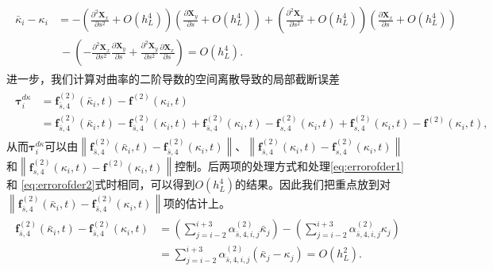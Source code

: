 \documentclass[a4paper,twoside]{ctexart}
\newcommand{\pdfrac}[2]{\frac{\partial #1}{\partial #2}}
\begin{document}
\begin{eqnarray}
  \begin{aligned}
  \label{eq:errorofcurv}
  \bar{\kappa}_i - \kappa_i &= -(\frac{\partial^2\boldsymbol X_x}{\partial
    s^2}+O(h_L^4))(\pdfrac{\boldsymbol X_y}{s}+O(h_L^4)) + (\frac{\partial^2\boldsymbol X_y}{\partial
                              s^2}+O(h_L^4))(\pdfrac{\boldsymbol X_x}{s}+O(h_L^4)) \\
  &\ -( -\frac{\partial^2\boldsymbol X_x}{\partial
    s^2}\pdfrac{\boldsymbol X_y}{s} + \frac{\partial^2\boldsymbol X_y}{\partial
    s^2}\pdfrac{\boldsymbol X_x}{s} )= O(h_L^4).
    \end{aligned}
\end{eqnarray}
\indent 进一步，我们计算对曲率的二阶导数的空间离散导致的局部截断误差
\begin{eqnarray}
  \begin{aligned}
  \boldsymbol{\tau}_i^{d\kappa} &=
  \boldsymbol f_{\bar{s},4}^{(2)}(\bar{\kappa}_i,t) -
  \boldsymbol f^{(2)}(\kappa_i,t)\\
  &= \boldsymbol f_{\bar{s},4}^{(2)}(\bar{\kappa}_i,t) -
  \boldsymbol f_{\bar{s},4}^{(2)}(\kappa_i,t) +
  \boldsymbol f_{\bar{s},4}^{(2)}(\kappa_i,t) -
  \boldsymbol f_{s,4}^{(2)}(\kappa_i,t) +
  \boldsymbol f_{s,4}^{(2)}(\kappa_i,t) - \boldsymbol f^{(2)}(\kappa_i,t),
  \label{eq:errorofdk}
  \end{aligned}
\end{eqnarray}
从而$\boldsymbol{\tau}_i^{d\kappa}$可以由$\left \| \boldsymbol f_{\bar{s},4}^{(2)}(\bar{\kappa}_i,t) -
  \boldsymbol f_{\bar{s},4}^{(2)}(\kappa_i,t)  \right \| $、$\left \| \boldsymbol f_{\bar{s},4}^{(2)}(\kappa_i,t) -
  \boldsymbol f_{s,4}^{(2)}(\kappa_i,t) \right \| $和$\left \|
  \boldsymbol f_{s,4}^{(2)}(\kappa_i,t) - \boldsymbol f^{(2)}(\kappa_i,t)
\right \| $控制。后两项的处理方式和处理\eqref{eq:errorofder1}和
\eqref{eq:errorofder2}式时相同，可以得到$O(h_L^4)$的结果。因此我们把重点放到对$\left \| \boldsymbol f_{\bar{s},4}^{(2)}(\bar{\kappa}_i,t) -
  \boldsymbol f_{\bar{s},4}^{(2)}(\kappa_i,t)  \right \| $项的估计上。
\begin{eqnarray}
  \begin{aligned}
  \boldsymbol f_{\bar{s},4}^{(2)}(\bar{\kappa}_i,t) -
  \boldsymbol f_{\bar{s},4}^{(2)}(\kappa_i,t) &=
  (\sum_{j=i-2}^{i+3}\alpha_{\bar{s},4,i,j}^{(2)}
  \bar{\kappa}_j) -
  (\sum_{j=i-2}^{i+3}\alpha_{\bar{s},4,i,j}^{(2)}\kappa_j) \\
  &=\sum_{j=i-2}^{i+3}\alpha_{\bar{s},4,i,j}^{(2)}(\bar{\kappa}_j - \kappa_j)= O(h_L^2).
  \label{eq:errorofdkt1}
  \end{aligned}
\end{eqnarray}
\end{document}
